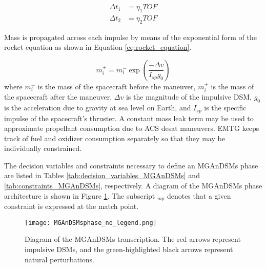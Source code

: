 \begin{align}
\Delta t_1 &= \eta_1 TOF\\
\Delta t_2 &= \eta_2 TOF
\label{eq:MGAnDSMs_time_calculations}
\end{align}

Mass is propagated across each impulse by means of the exponential form of the rocket equation as shown in Equation \ref{eq:rocket_equation}.

\begin{equation}
m_i^+ = m_i^- \exp \left(\frac{-\Delta v}{I_{sp} g_0}\right)
\label{eq:rocket_equation}
\end{equation}
%
where $m_i^-$ is the mass of the spacecraft before the maneuver, $m_i^+$ is the mass of the spacecraft after the maneuver, $\Delta v$ is the magnitude of the impulsive \ac{DSM}, $g_0$ is the acceleration due to gravity at sea level on Earth, and $I_{sp}$ is the specific impulse of the spacecraft's thruster. A constant mass leak term may be used to approximate propellant consumption due to \ac{ACS} desat maneuvers. \ac{EMTG} keeps track of fuel and oxidizer consumption separately so that they may be individually constrained.

The decision variables and constraints necessary to define an \ac{MGAnDSMs} phase are listed in Tables \ref{tab:decision_variables_MGAnDSMs} and \ref{tab:constraints_MGAnDSMs}, respectively. A diagram of the \ac{MGAnDSMs} phase architecture is shown in Figure \ref{fig:MGAnDSMs}. The subscript $_{mp}$ denotes that a given constraint is expressed at the match point.

\begin{figure}
	\centering
	\texttt{[image: MGAnDSMsphase\_no\_legend.png]}
	\caption{\label{fig:MGAnDSMs} Diagram of the \ac{MGAnDSMs} transcription. The red arrows represent impulsive \ac{DSM}s, and the green-highlighted black arrows represent natural perturbations.}
\end{figure}

